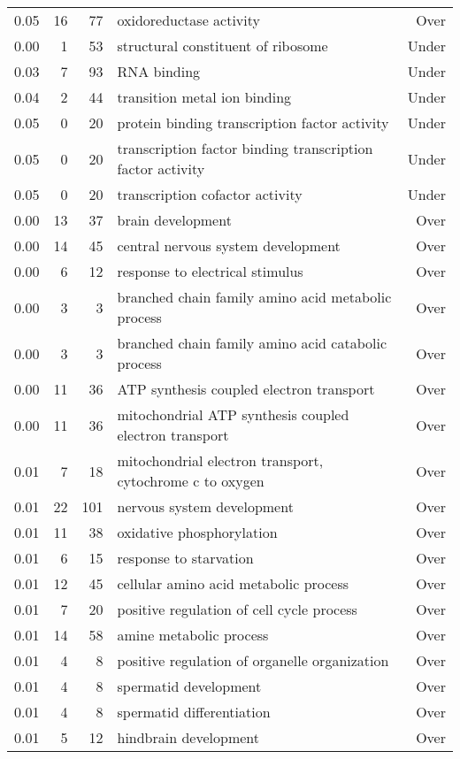 \begin{longtable}{rrrp{7cm}r}
  0.05 &  16 &  77 & oxidoreductase activity & Over \\ 
  0.00 &   1 &  53 & structural constituent of ribosome & Under \\ 
  0.03 &   7 &  93 & RNA binding & Under \\ 
  0.04 &   2 &  44 & transition metal ion binding & Under \\ 
  0.05 &   0 &  20 & protein binding transcription factor activity & Under \\ 
  0.05 &   0 &  20 & transcription factor binding transcription factor activity & Under \\ 
  0.05 &   0 &  20 & transcription cofactor activity & Under \\ 
   \hline
0.00 &  13 &  37 & brain development & Over \\ 
  0.00 &  14 &  45 & central nervous system development & Over \\ 
  0.00 &   6 &  12 & response to electrical stimulus & Over \\ 
  0.00 &   3 &   3 & branched chain family amino acid metabolic process & Over \\ 
  0.00 &   3 &   3 & branched chain family amino acid catabolic process & Over \\ 
  0.00 &  11 &  36 & ATP synthesis coupled electron transport & Over \\ 
  0.00 &  11 &  36 & mitochondrial ATP synthesis coupled electron transport & Over \\ 
  0.01 &   7 &  18 & mitochondrial electron transport, cytochrome c to oxygen & Over \\ 
  0.01 &  22 & 101 & nervous system development & Over \\ 
  0.01 &  11 &  38 & oxidative phosphorylation & Over \\ 
  0.01 &   6 &  15 & response to starvation & Over \\ 
  0.01 &  12 &  45 & cellular amino acid metabolic process & Over \\ 
  0.01 &   7 &  20 & positive regulation of cell cycle process & Over \\ 
  0.01 &  14 &  58 & amine metabolic process & Over \\ 
  0.01 &   4 &   8 & positive regulation of organelle organization & Over \\ 
  0.01 &   4 &   8 & spermatid development & Over \\ 
  0.01 &   4 &   8 & spermatid differentiation & Over \\ 
  0.01 &   5 &  12 & hindbrain development & Over \\ 

\end{longtable}
